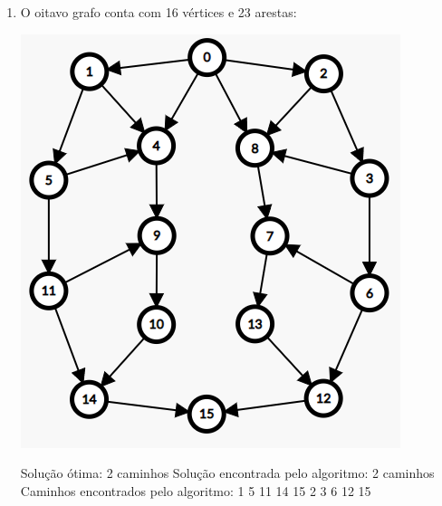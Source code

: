 \begin{enumerate}
    
    \item O oitavo grafo conta com 16 vértices e 23 arestas:
    \begin{center}
        \includegraphics[scale=0.4]{figuras/Grafo8.png}
    \end{center}
    Solução ótima: 2 caminhos\newline
    Solução encontrada pelo algoritmo: 2 caminhos\newline
    Caminhos encontrados pelo algoritmo: 1 5 11 14 15  2 3 6 12 15 \newline
    

\end{enumerate}
